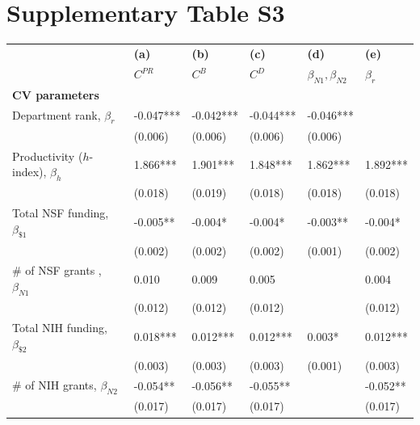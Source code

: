 \documentclass[10pt]{article}          %
\begin{document}
\newpage
\section{Supplementary Table S3}
\begin{table}[h]
\begin{tabular}{m{5cm} p{2.1cm} p{2.1cm} p{2.1cm} p{2.1cm} p{2.1cm} }
\hline
\hline
& \textbf{(a)} & \textbf{(b)} & \textbf{(c)} & \textbf{(d)} & \textbf{(e)} \\
& {$C^{PR}$} & {$C^{B}$} & {$C^{D}$} & \sout{$\beta_{N1}, \beta_{N2}$} & \sout{$\beta_{r}$} \\ \hline

\multicolumn{6}{l}{\textbf{CV parameters}} \\
\rowcolor{lightgray}
{Department rank, $\beta_r$}          & -0.047*** & -0.042*** & -0.044*** & -0.046*** &           \\
                                      & (0.006)   & (0.006)   & (0.006)   & (0.006)   &           \\
\rowcolor{lightgray}                               
{Productivity ($h$-index), $\beta_h$} & 1.866***  & 1.901***  & 1.848***  & 1.862***  & 1.892***  \\
                                      & (0.018)   & (0.019)   & (0.018)   & (0.018)   & (0.018)   \\
\rowcolor{lightgray}
{Total NSF funding, $\beta_{\$1}$}    & -0.005**  & -0.004*   & -0.004*   & -0.003**  & -0.004*   \\
                                      & (0.002)   & (0.002)   & (0.002)   & (0.001)   & (0.002)   \\
\rowcolor{lightgray}
{\# of NSF grants , $\beta_{N1}$}     & 0.010     & 0.009     & 0.005     &           & 0.004     \\
                                      & (0.012)   & (0.012)   & (0.012)   &           & (0.012)   \\
\rowcolor{lightgray}
{Total NIH funding, $\beta_{\$2}$}    & 0.018***  & 0.012***  & 0.012***  & 0.003*    & 0.012***  \\
                                      & (0.003)   & (0.003)   & (0.003)   & (0.001)   & (0.003)   \\
\rowcolor{lightgray}
{\# of NIH grants, $\beta_{N2}$}      & -0.054**  & -0.056**  & -0.055**  &           & -0.052**  \\
                                      & (0.017)   & (0.017)   & (0.017)   &           & (0.017)   \\ \hline


\end{tabular}
\end{table}
\end{document}
